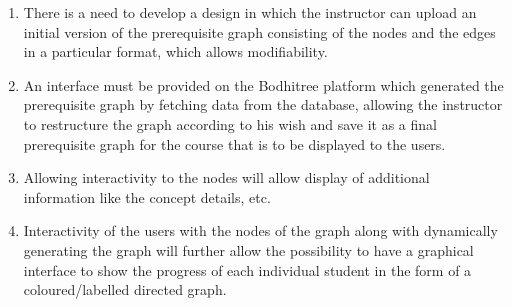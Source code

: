 \begin{enumerate}

	\item There is a need to develop a design in which the instructor can upload an initial version of the prerequisite graph consisting of the nodes and the edges in a particular format, which allows modifiability.
	
	\item An interface must be provided on the Bodhitree platform which generated the prerequisite graph by fetching data from the database, allowing the instructor to restructure the graph according to his wish and save it as a final prerequisite graph for the course that is to be displayed to the users.
	
	\item Allowing interactivity to the nodes will allow display of additional information like the concept details, etc.
	
	\item Interactivity of the users with the nodes of the graph along with dynamically generating the graph will further allow the possibility to have a graphical interface to show the progress of each individual student in the form of a coloured/labelled directed graph.

\end{enumerate}